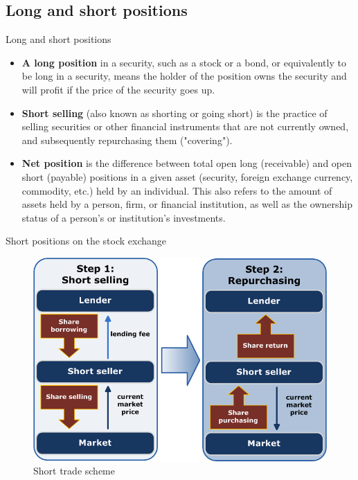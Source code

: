 \documentclass[international_finance_p1.tex]{subfiles}
\begin{document}
\subsection{Long and short positions}
\begin{frame}[shrink=15]{Long and short positions}
\begin{itemize}[<+->]
\item
\textbf{A long position }in a security, such as a stock or a bond, or equivalently to be long in a security, means the holder of the position owns the security and will profit if the price of the security goes up. 
\item
\textbf{Short selling }(also known as shorting or going short) is the practice of selling securities or other financial instruments that are not currently owned, and subsequently repurchasing them ("covering").
\item
\textbf{Net position} is the difference between total open long (receivable) and open short (payable) positions in a given asset (security, foreign exchange currency, commodity, etc.) held by an individual. This also refers to the amount of assets held by a person, firm, or financial institution, as well as the ownership status of a person's or institution's investments.
\end{itemize}
\end{frame}
\begin{frame}{Short positions on the stock exchange}
\begin{figure}
	\centering
	\includegraphics[scale=0.3]{img/shortselling.png}
	\caption{Short trade scheme}
\end{figure}

\end{frame}
\end{document}
